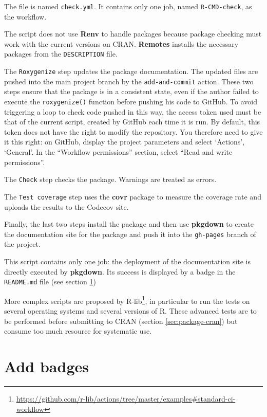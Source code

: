 \documentclass[
  12pt,
  american,
  a4paper,
  extrafontsizes,onecolumn,openright
  ]{memoir}
\newlength{\rf}
\begin{document}
The file is named \texttt{check.yml}.
It contains only one job, named \texttt{R-CMD-check}, as the workflow.

The script does not use \textbf{Renv} to handle packages because package checking must work with the current versions on CRAN.
\textbf{Remotes} installs the necessary packages from the \texttt{DESCRIPTION} file.

The \texttt{Roxygenize} step updates the package documentation.
The updated files are pushed into the main project branch by the \texttt{add-and-commit} action.
These two steps ensure that the package is in a consistent state, even if the author failed to execute the \texttt{roxygenize()} function before pushing his code to GitHub.
To avoid triggering a loop to check code pushed in this way, the access token used must be that of the current script, created by GitHub each time it is run.
By default, this token does not have the right to modify the repository.
You therefore need to give it this right: on GitHub, display the project parameters and select \enquote*{Actions}, \enquote*{General}.
In the \enquote{Workflow permissions} section, select \enquote{Read and write permissions}.

The \texttt{Check} step checks the package.
Warnings are treated as errors.

The \texttt{Test\ coverage} step uses the \textbf{covr} package to measure the coverage rate and uploads the results to the Codecov site.

Finally, the last two steps install the package and then use \textbf{pkgdown} to create the documentation site for the package and push it into the \texttt{gh-pages} branch of the project.

This script contains only one job: the deployment of the documentation site is directly executed by \textbf{pkgdown}.
Its success is displayed by a badge in the \texttt{README.md} file (see section \ref{sec:ci-badges})

More complex scripts are proposed by R-lib\footnote{\url{https://github.com/r-lib/actions/tree/master/examples\#standard-ci-workflow}}, in particular to run the tests on several operating systems and several versions of R.
These advanced tests are to be performed before submitting to CRAN (section \ref{sec:package-cran}) but consume too much resource for systematic use.

\hypertarget{sec:ci-badges}{%
\section{Add badges}\label{sec:ci-badges}}
\end{document}
